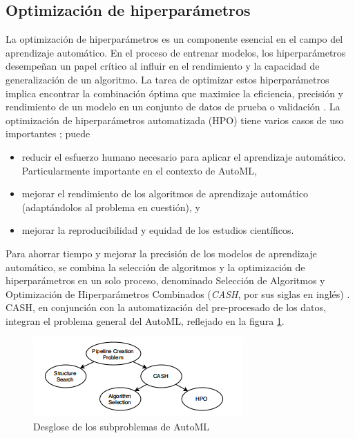 \subsection{Optimización de hiperparámetros} \label{epig:hpo}
La optimización de hiperparámetros es un componente esencial en el campo del aprendizaje automático. En el proceso de entrenar modelos, los hiperparámetros desempeñan un papel crítico al influir en el rendimiento y la capacidad de generalización de un algoritmo. La tarea de optimizar estos hiperparámetros implica encontrar la combinación óptima que maximice la eficiencia, precisión y rendimiento de un modelo en un conjunto de datos de prueba o validación  \citep{hastie2009elements}. La optimización de hiperparámetros automatizada (HPO) tiene varios casos de uso importantes  \citep{hutter2019automated}; puede
\begin{itemize}
	\item reducir el esfuerzo humano necesario para aplicar el aprendizaje automático. Particularmente importante en el contexto de AutoML,
	\item mejorar el rendimiento de los algoritmos de aprendizaje automático (adaptándolos al problema en cuestión), y
	\item mejorar la reproducibilidad y equidad de los estudios científicos.
\end{itemize}
Para ahorrar tiempo y mejorar la precisión de los modelos de aprendizaje automático, se combina la selección de algoritmos y la optimización de hiperparámetros en un solo proceso, denominado Selección de Algoritmos y Optimización de Hiperparámetros Combinados (\textit{CASH}, por sus siglas en inglés) \citep{tuggener2019automated}. CASH, en conjunción con la automatización del pre-procesado de los datos, integran el problema general del AutoML, reflejado en la figura \ref{fig:desglose-de-los-subproblemas-de-automl}. 

\begin{figure}[H]
	\centering
	\includegraphics[width=0.4\linewidth]{"figuras/capi 1/Desglose de los subproblemas de AutoML"}
	\caption{Desglose de los subproblemas de AutoML \citep{zoller2021benchmark}}
	\label{fig:desglose-de-los-subproblemas-de-automl}
\end{figure} 

